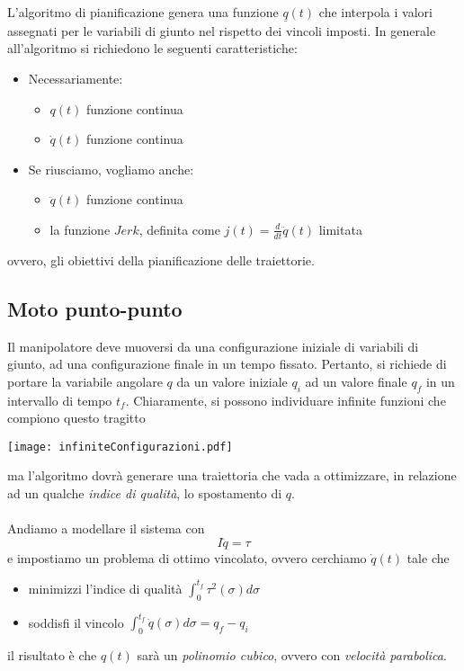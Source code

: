 \paragraph{}
L'algoritmo di pianificazione genera una funzione $\underline{q}(t)$ che interpola i valori assegnati per le variabili di giunto nel rispetto dei vincoli imposti. In generale all'algoritmo si richiedono le seguenti caratteristiche:
\begin{itemize}
	\item Necessariamente:
	\begin{itemize}
		\item $q(t)$ funzione continua
		\item $\dot{q}(t)$ funzione continua
	\end{itemize}
	\item Se riusciamo, vogliamo anche:
	\begin{itemize}
		\item $\ddot{q}(t)$ funzione continua
		\item la funzione $Jerk$, definita come $j(t) = \frac{d}{dt} \ddot{q}(t)$ limitata
	\end{itemize}
\end{itemize}
ovvero, gli obiettivi della pianificazione delle traiettorie.


\subsection{Moto punto-punto}
Il manipolatore deve muoversi da una configurazione iniziale di variabili di giunto, ad una configurazione finale in un tempo fissato. Pertanto, si richiede di portare la variabile angolare $q$ da un valore iniziale $q_i$ ad un valore finale $q_f$ in un intervallo di tempo $t_f$. Chiaramente, si possono individuare infinite funzioni che compiono questo tragitto
\begin{center}
	\texttt{[image: infiniteConfigurazioni.pdf]}
\end{center}
ma l'algoritmo dovrà generare una traiettoria che vada a ottimizzare, in relazione ad un qualche \emph{indice di qualità}, lo spostamento di $q$.

\paragraph{}
Andiamo a modellare il sistema con
\begin{equation}
	I\ddot{q} = \tau
\end{equation}
e impostiamo un problema di ottimo vincolato, ovvero cerchiamo $\dot{q}(t)$ tale che
\begin{itemize}
	\item minimizzi l'indice di qualità $\int_0^{t_f} \tau^2(\sigma) d \sigma$
	\item soddisfi il vincolo $\int_0^{t_f} \dot{q}(\sigma) d \sigma  = q_f - q_i$
\end{itemize}
il risultato è che $q(t)$ sarà un \emph{polinomio cubico}, ovvero con \emph{velocità parabolica}. 
